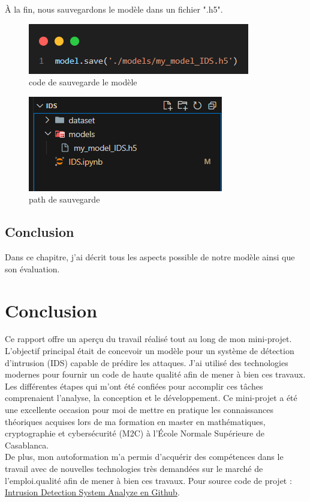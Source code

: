 \documentclass[a4paper,12pt]{report}
\begin{document}
À la fin, nous sauvegardons le modèle dans un fichier ".h5".
\begin{figure}[H]
\centering
 \includegraphics[scale=0.99]{outils-images/data26.png}
\caption{code de sauvegarde le modèle}
\end{figure}

\begin{figure}[H]
\centering
 \includegraphics[scale=0.99]{outils-images/data27.png}
\caption{path de sauvegarde}
\end{figure}

\section {Conclusion}
\noindent\normalsize Dans ce chapitre, j'ai décrit tous les aspects possible de notre modèle ainsi que son évaluation.

\chapter*{\centering Conclusion}
\noindent\normalsize Ce rapport offre un aperçu du travail réalisé tout au long de mon mini-projet. L'objectif principal était de concevoir un modèle pour un système de détection d'intrusion (IDS) capable de prédire les attaques. J'ai utilisé des technologies modernes pour fournir un code de haute qualité afin de mener à bien ces travaux.\\[0.5cm]
Les différentes étapes qui m'ont été confiées pour accomplir ces tâches comprenaient l'analyse, la conception et le développement. Ce mini-projet a été une excellente occasion pour moi de mettre en pratique les connaissances théoriques acquises lors de ma formation en master en mathématiques, cryptographie et cybersécurité (M2C) à l'École Normale Supérieure de Casablanca.\\[0.5cm]
De plus, mon autoformation m'a permis d'acquérir des compétences dans le travail avec de nouvelles technologies très demandées sur le marché de l'emploi.qualité afin de mener à bien ces travaux.
Pour source code de projet : \href{https://github.com/yassineboujrada/Intrusion_Detection_System_Analyze}{Intrusion Detection System Analyze en Github}.





\end{document}
